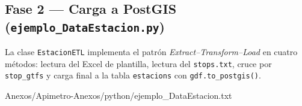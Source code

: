 \subsection*{Fase 2 — Carga a PostGIS
(\texttt{ejemplo\_DataEstacion.py})}

La clase \texttt{EstacionETL} implementa el patrón
\textit{Extract–Transform–Load} en cuatro métodos: lectura del Excel de
plantilla, lectura del \texttt{stops.txt}, cruce por \texttt{stop\_gtfs} y carga
final a la tabla \texttt{estacions} con \texttt{gdf.to\_postgis()}.

 {Anexos/Apimetro-Anexos/python/ejemplo_DataEstacion.txt}

